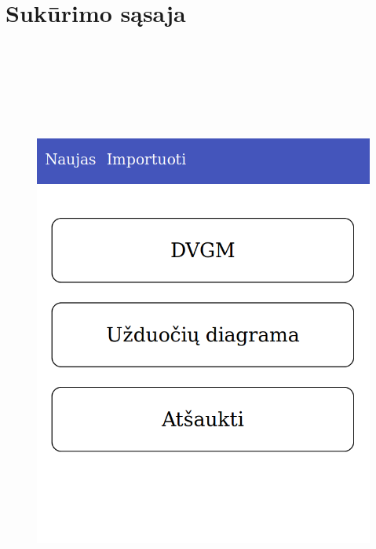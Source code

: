 \documentclass{VUMIFInfBakalaurinis}
\begin{document}
\section{Sukūrimo sąsaja} \label{appendix:run_examples_new}
\begin{figure}[H]
    \centering
    \includegraphics[height=20cm]{img/appendix/run_examples/new}
\end{figure}
\end{document}
